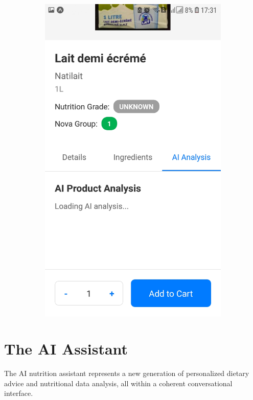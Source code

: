 \begin{figure}[h!]
\begin{subfigure}[b]{0.23\textwidth}
        \includegraphics[width=\textwidth]{images/natilait4.jpg}
    \end{subfigure}
\end{figure}


\section{The AI Assistant}
The AI nutrition assistant represents a new generation of personalized dietary advice and nutritional data analysis, all within a coherent conversational interface.
